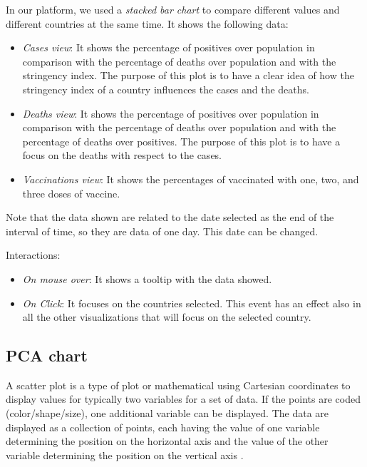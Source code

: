 \documentclass[10pt,conference]{IEEEtran}
\begin{document}
In our platform, we used a {\em stacked bar chart} to compare different values and different countries at the same time. 
It shows the following data:
\begin{itemize}
 \item {\em Cases view}: It shows the percentage of positives over population in comparison with the percentage of deaths over population and with the stringency index. The purpose of this plot is to have a clear idea of how the stringency index of a country influences the cases and the deaths.
 \item {\em Deaths view}: It shows the percentage of positives over population in comparison with the percentage of deaths over population and with the percentage of deaths over positives. The purpose of this plot is to have a focus on the deaths with respect to the cases.
 \item {\em Vaccinations view}: It shows the percentages of vaccinated with one, two, and three doses of vaccine.
\end{itemize}

Note that the data shown are related to the date selected as the end of the interval of time, so they are data of one day. This date can be changed.

Interactions:
\begin{itemize}
 \item {\em On mouse over}: It shows a tooltip with the data showed.
 \item {\em On Click}: It focuses on the countries selected. This event has an effect also in all the other visualizations that will focus on the selected country.
\end{itemize}

\begin{figure}
\end{figure}

\subsection{PCA chart}
A scatter plot is a type of plot or mathematical
using Cartesian coordinates to display values for typically two variables for a set of data. If the points are coded (color/shape/size), 
one additional variable can be displayed. The data are displayed as a collection of points, each having the value of one variable 
determining the position on the horizontal axis and the value of the other variable determining the position on the vertical axis \cite{scatter}.
\end{document}
